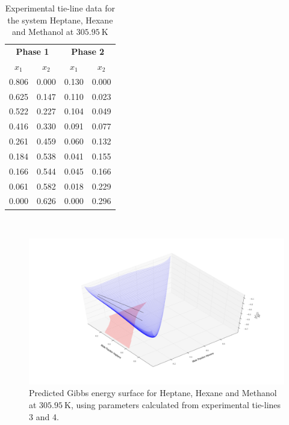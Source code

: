 \begin{table}[h]
\caption{Experimental tie-line data for the system Heptane, Hexane and Methanol at  $305.95~\mathrm{K}$ }
\centering
\begin{tabular}{cccc}
\toprule
\multicolumn{2}{c}{\textbf{Phase 1}} & \multicolumn{2}{c}{\textbf{Phase 2}}\\
$x_{1}$& $x_{2}$ &$x_{1}$& $x_{2}$\\
\midrule
0.806 & 0.000 & 0.130 & 0.000\\
0.625 & 0.147 & 0.110 & 0.023\\
0.522 & 0.227 & 0.104 & 0.049\\
0.416 & 0.330 & 0.091 & 0.077\\
0.261 & 0.459 & 0.060 & 0.132\\
0.184 & 0.538 & 0.041 & 0.155\\
0.166 & 0.544 & 0.045 & 0.166\\
0.061 & 0.582 & 0.018 & 0.229\\
0.000 & 0.626 & 0.000 & 0.296\\
\bottomrule
\end{tabular}\\
\label{TielineDataheptane-hexane-methanol}
\end{table}

\begin{figure}[h]
\vspace{40pt}
\centering
\includegraphics[width = \textwidth, bb=100 100 1600 700]{Results_Parts/TernaryParams/heptane-hexane-methanol/DWPMTieline3and4/rotation3.png}
\caption{Predicted Gibbs energy surface for Heptane, Hexane and Methanol at $305.95~\mathrm{K}$, using parameters calculated from experimental tie-lines 3 and 4.}
\label{heptane-hexane-methanolGibbsEnergySurface1}
\end{figure}

